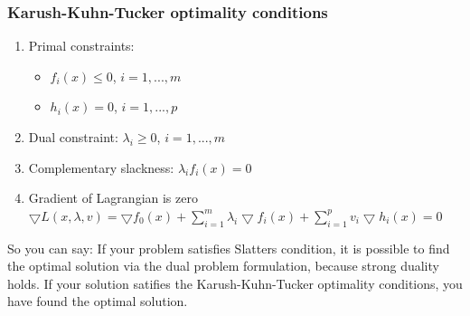 \subsubsection*{Karush-Kuhn-Tucker optimality conditions}
\begin{enumerate}
    \item
        Primal constraints:
        \begin{itemize}
            \item
                $f_i(x) \leq 0$, $i=1,...,m$
            \item
                $h_i(x) = 0$, $i=1,...,p$
        \end{itemize}
    \item
        Dual constraint: $\lambda_i \geq 0$, $i=1,...,m$
    \item
        Complementary slackness: $\lambda_i f_i(x) = 0$
    \item
        Gradient of Lagrangian is zero\\
        $\bigtriangledown L(x,\lambda,v) = \bigtriangledown f_0(x) + \sum_{i=1}^{m} \lambda_i \bigtriangledown f_i(x) + \sum_{i=1}^{p} v_i \bigtriangledown h_i(x) = 0$
\end{enumerate}

So you can say: If your problem satisfies Slatters condition, it is possible to find the optimal solution via the dual problem formulation, because strong duality holds. If your solution satifies the Karush-Kuhn-Tucker optimality conditions, you have found the optimal solution.


